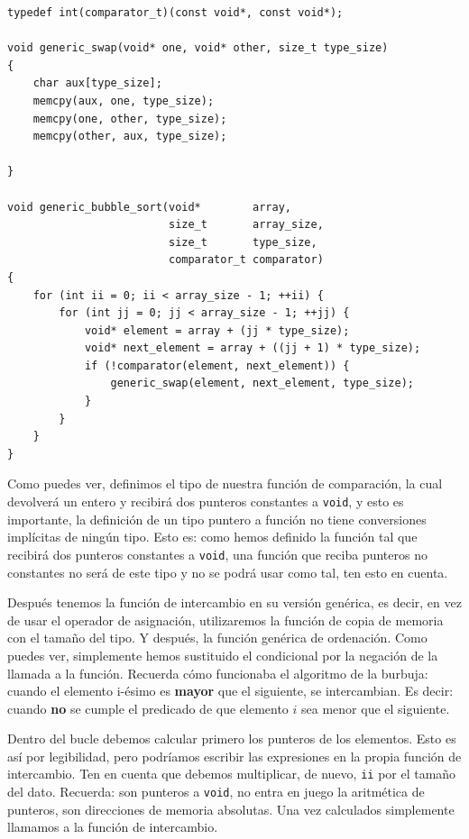 \documentclass[a4paper]{article}
\begin{document}
\noindent
\begin{minipage}[H]{\linewidth}
\mbox{}
\begin{lstlisting}[style=C,
caption={Definición de \texttt{bubble\_sort} genérico},
label={lst:bubbleSortGeneric}]
typedef int(comparator_t)(const void*, const void*);

void generic_swap(void* one, void* other, size_t type_size)
{
    char aux[type_size];
    memcpy(aux, one, type_size);
    memcpy(one, other, type_size);
    memcpy(other, aux, type_size);

}

void generic_bubble_sort(void*        array,
                         size_t       array_size,
                         size_t       type_size,
                         comparator_t comparator)
{
    for (int ii = 0; ii < array_size - 1; ++ii) {
        for (int jj = 0; jj < array_size - 1; ++jj) {
            void* element = array + (jj * type_size);
            void* next_element = array + ((jj + 1) * type_size);
            if (!comparator(element, next_element)) {
                generic_swap(element, next_element, type_size);
            }
        }
    }
}
\end{lstlisting}
\end{minipage}

Como puedes ver, definimos el tipo de nuestra función de comparación, la cual
devolverá un entero y recibirá dos punteros constantes a \verb!void!, y esto
es importante, la definición de un tipo puntero a función no tiene conversiones
implícitas de ningún tipo. Esto es: como hemos definido la función tal que
recibirá dos punteros constantes a \verb!void!, una función que reciba punteros
no constantes no será de este tipo y no se podrá usar como tal, ten esto en
cuenta.

Después tenemos la función de intercambio en su versión genérica, es decir,
en vez de usar el operador de asignación, utilizaremos la función de copia
de memoria con el tamaño del tipo. Y después, la función genérica de ordenación.
Como puedes ver, simplemente hemos sustituido el condicional por la negación
de la llamada a la función. Recuerda cómo funcionaba el algoritmo de la burbuja:
cuando el elemento i-ésimo es \textbf{mayor} que el siguiente, se intercambian.
Es decir: cuando \textbf{no} se cumple el predicado de que elemento $i$ sea
menor que el siguiente.

Dentro del bucle debemos calcular primero los punteros de los elementos. Esto
es así por legibilidad, pero podríamos escribir las expresiones en la propia
función de intercambio. Ten en cuenta que debemos multiplicar, de nuevo,
\verb!ii! por el tamaño del dato. Recuerda: son punteros a \verb!void!, no
entra en juego la aritmética de punteros, son direcciones de memoria
absolutas. Una vez calculados simplemente llamamos a la función de intercambio.
\end{document}

